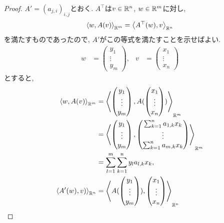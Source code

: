 \begin{proof}
  $A'=(a_{j,i})_{i,j}$とおく.
  $A^\top$は$v\in\mathbb{R}^n$, $w\in \mathbb{R}^m$に対し,
  \begin{align*}
    \Braket{w,A(v)}_{\mathbb{R}^m} =
        \Braket{A^\top(w),v}_{\mathbb{R}^n} 
  \end{align*}
  を満たすものであったので, $A'$がこの等式を満たすことを示せばよい.
  \begin{align*}
    w&=\begin{pmatrix}y_1\\\vdots\\y_m\end{pmatrix},&
    v&=\begin{pmatrix}x_1\\\vdots\\x_n\end{pmatrix}
  \end{align*}
  とすると,
  \begin{align*}
    \Braket{w,A(v)}_{\RR^m}
    &=\Braket{\begin{pmatrix}y_1\\\vdots\\y_m\end{pmatrix},A(\begin{pmatrix}x_1\\\vdots\\x_n\end{pmatrix})}_{\RR^m}\\
    &=\Braket{\begin{pmatrix}y_1\\\vdots\\y_m\end{pmatrix},\begin{pmatrix}\sum_{k=1}^na_{1,k}x_k\\\vdots\\\sum_{k=1}^na_{m,k}x_k\end{pmatrix}}_{\RR^m}\\
    &=\sum_{l=1}^m \sum_{k=1}^n y_{l}a_{l,k} x_k,\\
    \Braket{A'(w),v)}_{\RR^n}
    &=\Braket{A(\begin{pmatrix}y_1\\\vdots\\y_m\end{pmatrix}),\begin{pmatrix}x_1\\\vdots\\x_n\end{pmatrix}}_{\RR^n}\\

\end{align*}
\end{proof}
